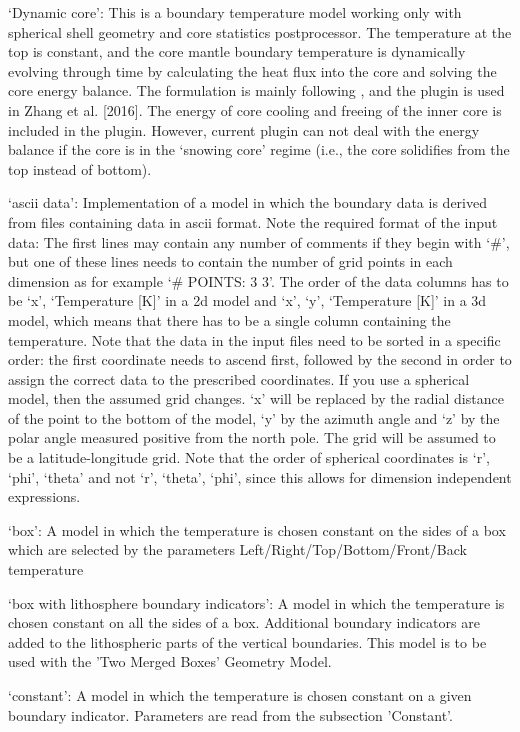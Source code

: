 \begin{itemize}
`Dynamic core': This is a boundary temperature model working only with spherical shell geometry and core statistics postprocessor. The temperature at the top is constant, and the core mantle boundary temperature is dynamically evolving through time by calculating the heat flux into the core and solving the core energy balance. The formulation is mainly following \cite{NPB+04}, and the plugin is used in Zhang et al. [2016]. The energy of core cooling and freeing of the inner core is included in the plugin. However, current plugin can not deal with the energy balance if the core is in the `snowing core' regime (i.e., the core solidifies from the top instead of bottom).

`ascii data': Implementation of a model in which the boundary data is derived from files containing data in ascii format. Note the required format of the input data: The first lines may contain any number of comments if they begin with `\#', but one of these lines needs to contain the number of grid points in each dimension as for example `\# POINTS: 3 3'. The order of the data columns has to be `x', `Temperature [K]' in a 2d model and  `x', `y', `Temperature [K]' in a 3d model, which means that there has to be a single column containing the temperature. Note that the data in the input files need to be sorted in a specific order: the first coordinate needs to ascend first, followed by the second in order to assign the correct data to the prescribed coordinates. If you use a spherical model, then the assumed grid changes. `x' will be replaced by the radial distance of the point to the bottom of the model, `y' by the azimuth angle and `z' by the polar angle measured positive from the north pole. The grid will be assumed to be a latitude-longitude grid. Note that the order of spherical coordinates is `r', `phi', `theta' and not `r', `theta', `phi', since this allows for dimension independent expressions.

`box': A model in which the temperature is chosen constant on the sides of a box which are selected by the parameters Left/Right/Top/Bottom/Front/Back temperature

`box with lithosphere boundary indicators': A model in which the temperature is chosen constant on all the sides of a box. Additional boundary indicators are added to the lithospheric parts of the vertical boundaries. This model is to be used with the 'Two Merged Boxes' Geometry Model.

`constant': A model in which the temperature is chosen constant on a given boundary indicator.  Parameters are read from the subsection 'Constant'.


\end{itemize}
